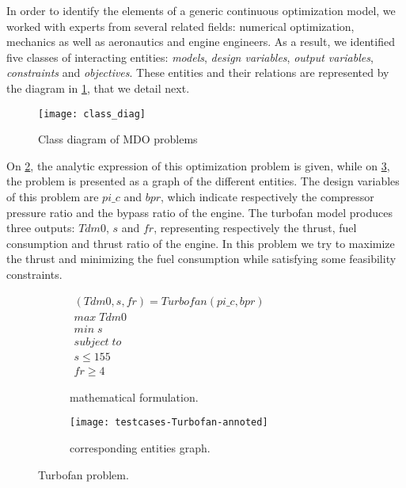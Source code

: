 In order to identify the elements of a generic continuous optimization model, we worked with experts from several related fields: numerical optimization, mechanics as well as aeronautics and engine engineers. As a result, we identified five classes of interacting entities: \emph{models}, \emph{design variables}, \emph{output variables}, \emph{constraints} and \emph{objectives}. These entities and their relations are represented by the diagram in \figurename{} \ref{class_diag}, that we detail next.

\begin{figure}[t]
	\centering
	\texttt{[image: class\_diag]}
	\caption{Class diagram of MDO problems}
	\label{class_diag}
\end{figure}

On \figurename{} \ref{turbofan:math}, the analytic expression of this optimization problem is given, while on \figurename{} \ref{turbofan:graph}, the problem is presented as a graph of the different entities. The design variables of this problem are $pi\_c$ and $bpr$, which indicate respectively the compressor pressure ratio and the bypass ratio of the engine. The turbofan model produces three outputs: $Tdm0$, $s$ and $fr$, representing respectively the thrust, fuel consumption and thrust ratio of the engine. In this problem we try to maximize the thrust and minimizing the fuel consumption while satisfying some feasibility constraints. 

\begin{figure}
\centering
	\begin{subfigure}[b]{0.4\textwidth}
		$\begin{array}{c}
			(Tdm0, s, fr) = Turbofan(pi\_c, bpr) \\
			max \; Tdm0 \\
			min \; s \\
			subject \; to \\
			s \leq 155 \\
			fr \geq 4
		\end{array}$
		\caption{mathematical formulation.}\label{turbofan:math}
	\end{subfigure}
	\hfill%
	\begin{subfigure}[b]{0.55\textwidth}
			\centering
			\texttt{[image: testcases-Turbofan-annoted]}
			\caption{corresponding entities graph.}\label{turbofan:graph}
	\end{subfigure}
\caption{Turbofan problem.}
\label{turbofan}

\end{figure}

